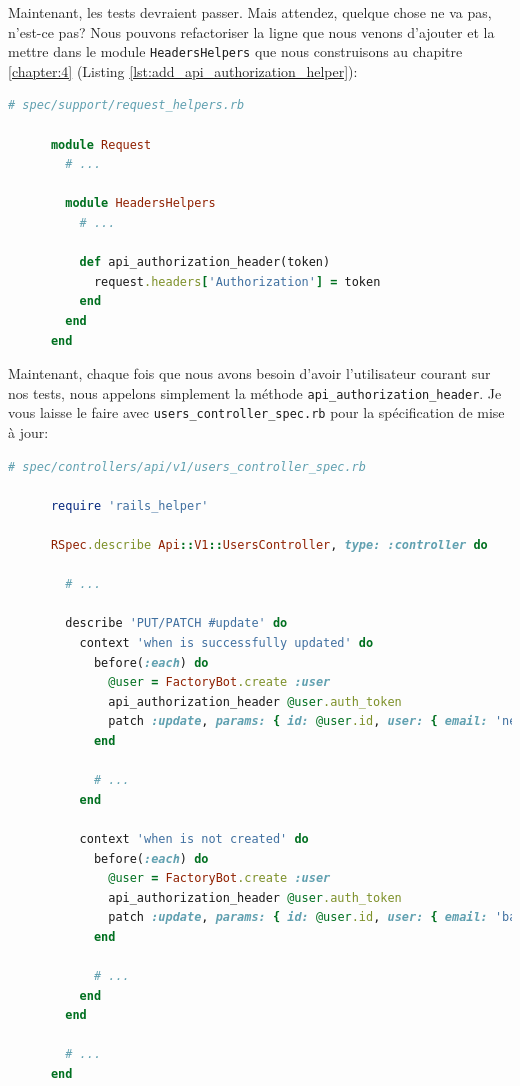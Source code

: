 \documentclass[]{report}
\begin{document}
    Maintenant, les tests devraient passer. Mais attendez, quelque chose ne va pas, n'est-ce pas? Nous pouvons refactoriser la ligne que nous venons d'ajouter et la mettre dans le module \verb|HeadersHelpers| que nous construisons au chapitre \ref{chapter:4} (Listing \ref{lst:add_api_authorization_helper}):

    \begin{scriptsize}
      \begin{lstlisting}[language=ruby, label={lst:add_api_authorization_helper}, caption={Factorisation de l'initialisation de l'en-tête Authorization}]
      # spec/support/request_helpers.rb

      module Request
        # ...

        module HeadersHelpers
          # ...

          def api_authorization_header(token)
            request.headers['Authorization'] = token
          end
        end
      end
      \end{lstlisting}
    \end{scriptsize}

    Maintenant, chaque fois que nous avons besoin d'avoir l'utilisateur courant sur nos tests, nous appelons simplement la méthode \verb|api_authorization_header|. Je vous laisse le faire avec \verb|users_controller_spec.rb| pour la spécification de mise à jour:

    \begin{scriptsize}
      \begin{lstlisting}[language=ruby]
      # spec/controllers/api/v1/users_controller_spec.rb

      require 'rails_helper'

      RSpec.describe Api::V1::UsersController, type: :controller do

        # ...

        describe 'PUT/PATCH #update' do
          context 'when is successfully updated' do
            before(:each) do
              @user = FactoryBot.create :user
              api_authorization_header @user.auth_token
              patch :update, params: { id: @user.id, user: { email: 'newmail@example.com' } }, format: :json
            end

            # ...
          end

          context 'when is not created' do
            before(:each) do
              @user = FactoryBot.create :user
              api_authorization_header @user.auth_token
              patch :update, params: { id: @user.id, user: { email: 'bademail.com' } }, format: :json
            end

            # ...
          end
        end

        # ...
      end
      \end{lstlisting}
    \end{scriptsize}
\end{document}
